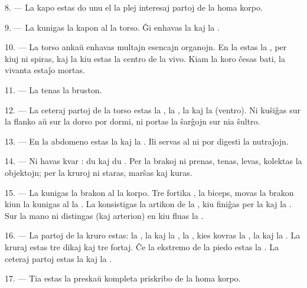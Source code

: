 8. --- La kapo estas do unu el la plej interesaj partoj de la homa korpo.

\VUsaut{4.4mm}
\VUsaut{3.0mm}

9. --- La  kunigas la kapon al la torso. Ĝi enhavas la
 kaj la .

10. --- La torso ankaŭ enhavas multajn esencajn organojn. En la 
estas la , per kiuj ni spiras, kaj la  kiu estas
la centro de la vivo. Kiam la koro ĉesas bati, la vivanta estaĵo mortas.

11. --- La  tenas la bruston.

12. --- La ceteraj partoj de la torso estas la , la
, la  kaj la  (ventro). Ni
kuŝiĝas sur la flanko aŭ sur la dorso por dormi, ni portas la ŝarĝojn sur nia
ŝultro.

13. --- En la abdomeno estas la  kaj la . Ili
servas al ni por digesti la nutraĵojn.

\VUsaut{4.4mm}
\VUsaut{3.0mm}

14. --- Ni havas kvar : du  kaj du
. Per la brakoj ni prenas, tenas, levas, kolektas la objektojn;
per la kruroj ni staras, marŝas kaj kuras.

15. --- La  kunigas la brakon al la korpo. Tre fortika
, la biceps, movas la brakon kiun la  kunigas
al la . La  konsistigas la artikon de la
, kiu finiĝas per la  kaj la . Sur
la mano ni distingas  (kaj arterion) en kiu fluas la
.

16. --- La partoj de la kruro estas: la , la 
kaj la , la , kies  kovras la
, la  kaj la . La kruraj
 estas tre dikaj kaj tre fortaj. Ĉe la ekstremo de la piedo
estas la . La ceteraj partoj estas la  kaj
la .

17. --- Tia estas la preskaŭ kompleta priskribo de la homa korpo.

